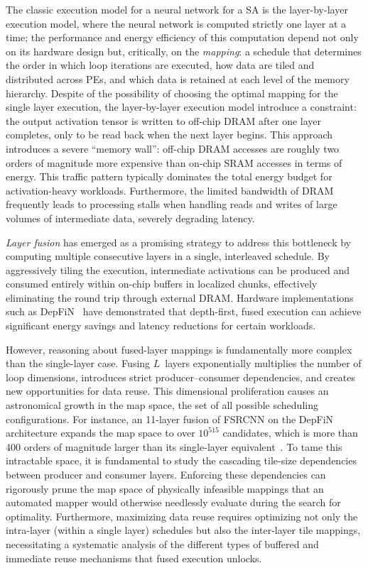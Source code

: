 The classic execution model for a neural network for a SA is the layer-by-layer execution model, where the neural network is computed strictly one layer at a time; the performance and energy efficiency of this computation depend not only on its hardware design but, critically, on the \emph{mapping}:
a schedule that determines the order in which loop iterations are
executed, how data are tiled and distributed across PEs, and which
data is retained at each level of the memory hierarchy.
Despite of the possibility of choosing the optimal mapping for the single layer execution, the layer-by-layer execution model introduce a constraint: the output activation tensor is written to off-chip DRAM after one layer completes, only to be read back when the next layer begins. This approach introduces a severe
``memory wall'': off-chip DRAM accesses are roughly two orders of magnitude
more expensive than on-chip SRAM accesses in terms of energy. This
traffic pattern typically dominates the total energy budget for activation-heavy
workloads. Furthermore, the limited bandwidth of DRAM frequently leads to
processing stalls when handling reads and writes of large volumes of intermediate data, severely
degrading latency.

\emph{Layer fusion} has emerged as a promising strategy to address this
bottleneck by computing multiple consecutive layers in a single, interleaved
schedule. By aggressively tiling the execution, intermediate activations
can be produced and consumed entirely within on-chip buffers in localized
chunks, effectively eliminating the round trip through external DRAM.
Hardware implementations such as DepFiN~\cite{goetschalckx2023depfin}
have demonstrated that depth-first, fused execution can achieve
significant energy savings and latency reductions for certain workloads.

However, reasoning about fused-layer mappings is fundamentally more complex than the single-layer case. Fusing $L$~layers exponentially multiplies the number of loop dimensions, introduces strict producer--consumer dependencies, and creates new opportunities for data reuse. This dimensional proliferation causes an astronomical growth in the map space, the set of all possible scheduling configurations. For instance, an 11-layer fusion of FSRCNN on the DepFiN architecture expands the map space to over $10^{515}$ candidates, which is more than 400 orders of magnitude larger than its single-layer equivalent~\cite{Factorflow}. To tame this intractable space, it is fundamental to study the cascading tile-size dependencies between producer and consumer layers. Enforcing these dependencies can rigorously prune the map space of physically infeasible mappings that an automated mapper would otherwise needlessly evaluate during the search for optimality. Furthermore, maximizing data reuse requires optimizing not only the intra-layer (within a single layer) schedules but also the inter-layer tile mappings, necessitating a systematic analysis of the different types of buffered and immediate reuse mechanisms that fused execution unlocks.

